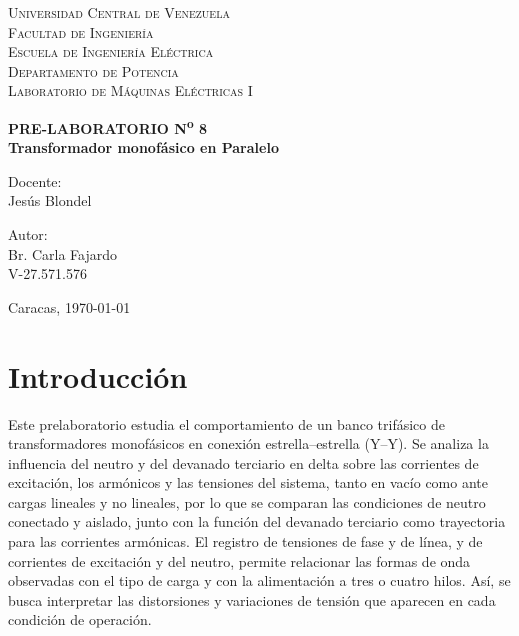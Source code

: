 \documentclass[12pt]{article}
\begin{document}
\thispagestyle{empty}

\begin{center}
    \textsc{Universidad Central de Venezuela}\\[0.35cm]
    \textsc{Facultad de Ingenier\'ia}\\[0.35cm]
    \textsc{Escuela de Ingenier\'ia El\'ectrica}\\[0.35cm]
    \textsc{Departamento de Potencia}\\[0.35cm]
    \textsc{Laboratorio de M\'aquinas El\'ectricas I}
\end{center}

\vspace{6.8cm}

\begin{center}
    \textbf{PRE-LABORATORIO N\textsuperscript{o} 8}\\[0.35cm]
    \textbf{Transformador monof\'asico en Paralelo}
\end{center}

\vfill

\noindent
\begin{minipage}[t]{0.48\textwidth}
    Docente:\\[0.25cm]
    Jes\'us Blondel
\end{minipage}%
\hfill
\begin{minipage}[t]{0.48\textwidth}
    \raggedleft
    Autor:\\[0.25cm]
    Br. Carla Fajardo\\[0.25cm]
    V-27.571.576
\end{minipage}

\vspace{1.1cm}

\begin{center}
    Caracas, \today
\end{center}

\newpage

\section{Introducci\'on}
Este prelaboratorio estudia el comportamiento de un banco trif\'asico de transformadores monof\'asicos en conexi\'on estrella--estrella (Y--Y). Se analiza la influencia del neutro y del devanado terciario en delta sobre las corrientes de excitaci\'on, los arm\'onicos y las tensiones del sistema, tanto en vac\'io como ante cargas lineales y no lineales, por lo que se comparan las condiciones de neutro conectado y aislado, junto con la funci\'on del devanado terciario como trayectoria para las corrientes arm\'onicas. El registro de tensiones de fase y de l\'inea, y de corrientes de excitaci\'on y del neutro, permite relacionar las formas de onda observadas con el tipo de carga y con la alimentaci\'on a tres o cuatro hilos. As\'i, se busca interpretar las distorsiones y variaciones de tensi\'on que aparecen en cada condici\'on de operaci\'on.
\newpage
\end{document}
